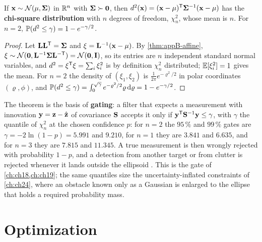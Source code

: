 \begin{theorem}
\label{thm:appB-chi2}
If $\mathbf{x} \sim \mathcal{N}(\mathbf{\mu}, \mathbf{\Sigma})$ in $\mathbb{R}^n$ with $\mathbf{\Sigma} \succ \mathbf{0}$, then $d^2(\mathbf{x}) = (\mathbf{x} - \mathbf{\mu})^{\mathsf{T}}\mathbf{\Sigma}^{-1}(\mathbf{x} - \mathbf{\mu})$ has the \textbf{chi-square distribution} with $n$ degrees of freedom, $\chi^2_n$, whose mean is $n$. For $n = 2$, $\mathbb{P}(d^2 \le \gamma) = 1 - e^{-\gamma/2}$.
\end{theorem}
\begin{proof}
Let $\mathbf{L}\mathbf{L}^{\mathsf{T}} = \mathbf{\Sigma}$ and $\mathbf{\xi} = \mathbf{L}^{-1}(\mathbf{x} - \mathbf{\mu})$. By \cref{thm:appB-affine}, $\mathbf{\xi} \sim \mathcal{N}(\mathbf{0}, \mathbf{L}^{-1}\mathbf{\Sigma}\mathbf{L}^{-\mathsf{T}}) = \mathcal{N}(\mathbf{0}, \mathbf{I})$, so its entries are $n$ independent standard normal variables, and $d^2 = \mathbf{\xi}^{\mathsf{T}}\mathbf{\xi} = \sum_i \xi_i^2$ is by definition $\chi^2_n$ distributed; $\mathbb{E}[\xi_i^2] = 1$ gives the mean. For $n = 2$ the density of $(\xi_1, \xi_2)$ is $\frac{1}{2\pi}e^{-\varrho^2/2}$ in polar coordinates $(\varrho, \phi)$, and $\mathbb{P}(d^2 \le \gamma) = \int_0^{\sqrt{\gamma}} e^{-\varrho^2/2}\varrho\,\mathrm{d}\varrho = 1 - e^{-\gamma/2}$. \qedhere
\end{proof}

The theorem is the basis of \textbf{gating}: a filter that
expects a measurement with innovation $\mathbf{y} = \mathbf{z} - \hat{\mathbf{z}}$ of
covariance $\mathbf{S}$ accepts it only if $\mathbf{y}^{\mathsf{T}}\mathbf{S}^{-1}\mathbf{y} \le
\gamma$, with $\gamma$ the quantile of $\chi^2_n$ at the chosen confidence $p$:
for $n = 2$ the $95\,\%$ and $99\,\%$ gates are $\gamma = -2\ln(1-p) = 5.991$
and $9.210$, for $n = 1$ they are $3.841$ and $6.635$, and for $n = 3$ they
are $7.815$ and $11.345$. A true measurement is then wrongly rejected with
probability $1 - p$, and a detection from another target or from clutter is
rejected whenever it lands outside the ellipsoid \cite{barshalom2001estimation}.
This is the gate of \cref{ch:ch18,ch:ch19}; the same quantiles size the
uncertainty-inflated constraints of \cref{ch:ch24}, where an obstacle known
only as a Gaussian is enlarged to the ellipse that holds a required
probability mass.

\section{Optimization}
\label{sec:appB-optimization}

